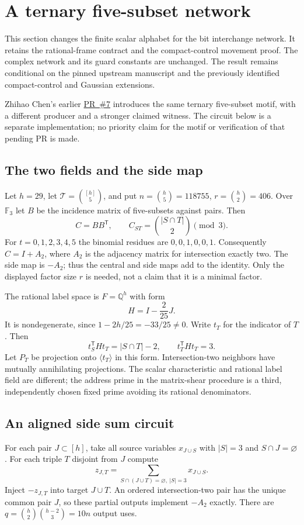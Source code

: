 \section{A ternary five-subset network}
\label{sec:ternary-five-subsets}

This section changes the finite scalar alphabet for the bit interchange
network. It retains the rational-frame contract and the compact-control
movement proof. The complex network and its guard constants are unchanged.
The result remains conditional on the pinned upstream manuscript and the
previously identified compact-control and Gaussian extensions.

Zhihao Chen's earlier
\href{https://github.com/CrocSwap/integer-mult-bounds/pull/7}{PR~\#7}
introduces the same ternary five-subset motif, with a different producer and
a stronger claimed witness. The circuit below is a separate implementation;
no priority claim for the motif or verification of that pending PR is made.

\subsection{The two fields and the side map}
Let $h=29$, let $\mathcal T=\binom{[h]}5$, and put
$n=\binom h5=118755$, $r=\binom h2=406$. Over $\mathbb F_3$ let $B$ be
the incidence matrix of five-subsets against pairs. Then
\[
 C=BB^{\mathsf T},\qquad C_{ST}=\binom{|S\cap T|}{2}\pmod3.
\]
For $t=0,1,2,3,4,5$ the binomial residues are $0,0,1,0,0,1$.
Consequently $C=I+A_2$, where $A_2$ is the adjacency matrix for
intersection exactly two. The side map is $-A_2$; thus the central
and side maps add to the identity. Only the displayed factor size $r$
is needed, not a claim that it is a minimal factor.

The rational label space is $F=\mathbb Q^h$ with form
\[
 H=I-\frac2{25}J.
\]
It is nondegenerate, since $1-2h/25=-33/25\ne0$. Write $t_T$ for the
indicator of $T$. Then
\[
 t_S^{\mathsf T}Ht_T=|S\cap T|-2,\qquad
 t_T^{\mathsf T}Ht_T=3.
\]
Let $P_T$ be projection onto $\langle t_T\rangle$ in this form.
Intersection-two neighbors have mutually annihilating projections.
The scalar characteristic and rational label field are different;
the address prime in the matrix-shear procedure is a third, independently
chosen fixed prime avoiding its rational denominators.

\subsection{An aligned side sum circuit}
For each pair $J\subset[h]$, take all source variables $x_{J\cup S}$
with $|S|=3$ and $S\cap J=\varnothing$. For each triple $T$ disjoint
from $J$ compute
\[
 z_{J,T}=\sum_{S\cap(J\cup T)=\varnothing,\ |S|=3}x_{J\cup S}.
\]
Inject $-z_{J,T}$ into target $J\cup T$. An ordered intersection-two
pair has the unique common pair $J$, so these partial outputs implement
$-A_2$ exactly. There are $q=\binom h2\binom{h-2}3=10n$ output uses.

